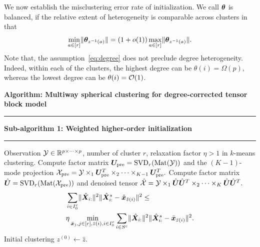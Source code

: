 \documentclass[lettersize,journal]{IEEEtran}
\theoremstyle{definition}
\theoremstyle{definition}
\newcommand\Algphase[1]{%
\vspace*{-.7\baselineskip}\Statex\hspace*{\dimexpr-\algorithmicindent-2pt\relax}\rule{\columnwidth}{0.4pt}%
\Statex\hspace*{-\algorithmicindent}\textbf{#1}%
\vspace*{-.7\baselineskip}\Statex\hspace*{\dimexpr-\algorithmicindent-2pt\relax}\rule{\columnwidth}{0.4pt}%
}
\begin{document}
We now establish the misclustering error rate of initialization. We call $\boldsymbol{\theta}$ is balanced, if the relative extent of heterogeneity is comparable across clusters in that
\begin{equation}\label{eq:degree}
{\min_{a\in[r]} \onormSize{}{\mtheta_{z^{-1}(a)}}=\left(1+o(1)\right)\max_{a\in[r]}\onormSize{}{\mtheta_{z^{-1}(a)}}}.
\end{equation}
Note that, the assumption~\eqref{eq:degree} does not preclude degree heterogeneity. Indeed, within each of the clusters, the highest degree can be $\theta(i) = \Omega(p)$, whereas the lowest degree can be $\theta(i)=\mathcal{O}(1)$. 


\begin{algorithm}[h!]
\caption*{\bf Algorithm: Multiway spherical clustering for degree-corrected tensor block model }
\vspace{.15cm}
\begin{algorithmic}[1]
\Algphase{Sub-algorithm 1: Weighted higher-order initialization}
\INPUT Observation $\mathcal{Y} \in \mathbb{R}^{p\times \cdots \times p}$, number of cluster $r$, relaxation factor $\eta > 1$ in $k$-means clustering.
\State Compute factor matrix $ \bm{U}_{\text{pre}} = \text{SVD}_{r} (\text{Mat}(\mathcal{Y}))$ and the $(K-1)$-mode projection $
\mathcal{X}_{\text{pre}} = \mathcal{Y} \times_1  \bm{U}_{\text{pre}}^T \times_2 \cdots \times_{K-1} \bm{U}_{\text{pre}}^T.$
\State Compute factor matrix $\hat {\bm{U}} = \text{SVD}_{r}(\text{Mat}(\mathcal{X}_{\text{pre}}))$ and denoised tensor
$\hat {\mathcal{X}} = \mathcal{Y} \times_1 \hat {\bm{U}} \hat {\bm{U}}^T \times_2 \cdots \times_K \hat {\bm{U}} \hat {\bm{U}}^T.$
\begin{align}
    &\sum_{i \in I_0^c }  \lVert\hat {\bm X}_{i:}\rVert^2 \lVert\hat {\bm X}_{i:}^s - \hat {\bm x}_{\hat z(i)} \rVert^2 
    \leq \\
    &\eta \min_{\substack{\bar {\bm x}_j, j\in[r], \bar z(i),i\in I_0^{c}}} \sum_{i \in S^c } \lVert\hat {\bm X}_{i:}\rVert^2 \lVert \hat {\bm X}_{i:}^s -   \bar {\bm x}_{\bar z(i)}\rVert^2.
\end{align}
\OUTPUT Initial clustering $z^{(0)} \leftarrow \hat z$.


\end{algorithmic}
\end{algorithm}
\end{document}

